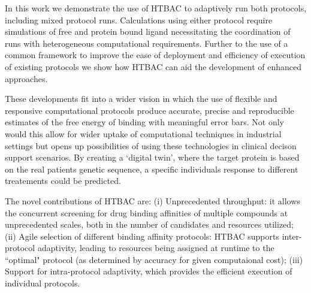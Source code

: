 In this work we demonstrate the use of HTBAC to adaptively run both protocols,
including mixed protocol runs. 
Calculations using either protocol require simulations of free and 
protein bound ligand necessitating the coordination of runs with 
heterogeneous computational requirements.
Further to the use of a common framework to improve the ease of deployment and
efficiency of execution of existing protocols we show how HTBAC can aid the
development of enhanced approaches. 


These developments fit into a wider vision in which the use of
flexible and responsive computational protocols produce accurate,
precise and reproducible estimates of the free energy of binding with meaningful error bars. Not only
would this allow for wider uptake of computational techniques in industrial
settings but opens up possibilities of using these technologies in clinical
decison support scenarios. By creating a `digital twin', where the target
protein is based on the real patients genetic sequence, a specific individuals
response to different treatements could be predicted. 


The novel contributions of HTBAC are: (i) Unprecedented throughput: it allows
the concurrent screening for drug binding affinities of multiple compounds at
unprecedented scales, both in the number of candidates and resources utilized;
(ii) Agile selection of different binding affinity protocols: HTBAC supports
inter-protocol adaptivity, leading to resources being assigned at runtime to
the ``optimal" protocol (as determined by accuracy for given computaional
cost); (iii) Support for intra-protocol adaptivity, which provides the
efficient execution of individual protocols. 

